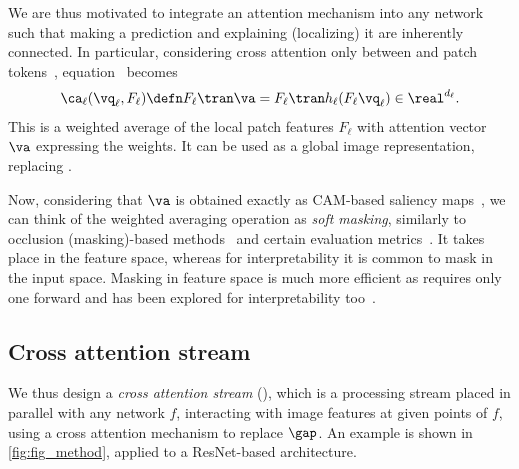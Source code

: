 We are thus motivated to integrate an attention mechanism into any network such that making a prediction and explaining (localizing) it are inherently connected. In particular, considering cross attention only between \cls and patch tokens~, equation~ becomes
\begin{align}
	\ca_\ell(\vq_\ell, F_\ell) \defn F_\ell\tran \va = F_\ell\tran h_\ell(F_\ell \vq_\ell) \in \real^{d_\ell}.
\label{eq:CA}
\end{align}
This is a weighted average of the local patch features $F_\ell$ with attention vector $\va$ expressing the weights. It can be used as a global image representation, replacing \gap.

Now, considering that $\va$ is obtained exactly as CAM-based saliency maps~, we can think of the weighted averaging operation as \emph{soft masking}, similarly to occlusion (masking)-based methods~\citep{petsiuk2018rise,fong2017interpretable,fong2019understanding,schulz2020restricting,ribeiro2016should,DBLP:journals/corr/abs-1910-01279,zhang2023opti} and certain evaluation metrics~\cite{petsiuk2018rise}. It takes place in the feature space, whereas for interpretability it is common to mask in the input space. Masking in feature space is much more efficient as requires only one forward and has been explored for interpretability too~\cite{schulz2020restricting}.


\subsection{Cross attention stream}
\label{subsec:CA-base}

We thus design a \emph{cross attention stream} (\Ours), which is a processing stream placed in parallel with any network $f$, interacting with image features at given points of $f$, using a cross attention mechanism to replace $\gap$. An example is shown in \autoref{fig:fig_method}, applied to a ResNet-based architecture.

